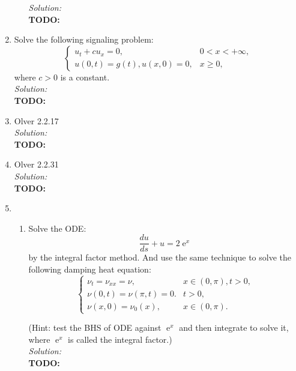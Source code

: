\documentclass[10pt]{amsart}
\DeclareMathOperator{\E}{e}
\theoremstyle{nonumberplain}
\begin{document}
\begin{enumerate}[label={\bf {\arabic*}:}]
\begin{enumerate}
\noindent
\textit{Solution:} \\
\textbf{TODO:} \\

\end{enumerate}

\newpage

\item Solve the following signaling problem: 
$$
\begin{cases}
u_t + cu_x = 0, & 0< x< + \infty, \\
u(0, t) = g(t), u(x, 0) = 0, &x \geq0,
\end{cases}
$$
where $c > 0$ is a constant. \\

\noindent
\textit{Solution:} \\
\textbf{TODO: } \\

\newpage

\item Olver 2.2.17 \\

\noindent
\textit{Solution:} \\
\textbf{TODO: } \\
\newpage


\item Olver 2.2.31 \\

\noindent
\textit{Solution:} \\
\textbf{TODO: } \\
\newpage

\item 
\begin{enumerate}
\item Solve the ODE:
$$
\frac {du}{ds} + u = 2\E^x
$$
by the integral factor method.
And use the same technique to solve the following damping heat equation:
$$
\begin{cases}
\nu_t = \nu_{xx} = \nu, &x\in(0, \pi), t> 0, \\
\nu(0, t) = \nu(\pi, t) = 0. &t > 0, \\
\nu(x, 0) = \nu_0(x), &x \in (0, \pi).
\end{cases}
$$

\noindent
(Hint: test the BHS of ODE against $\E^x$ and then integrate to solve it, where $\E^x$ is called the integral factor.) \\

\noindent
\textit{Solution:} \\
\textbf{TODO: } \\


\end{enumerate}
\end{enumerate}
\end{document}
